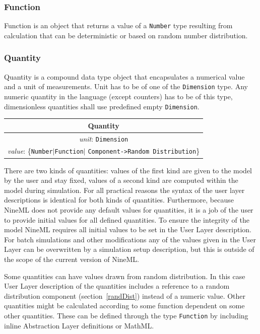 \documentclass{article}
\begin{document}
\subsubsection{Function}

Function is an object that returns a value of a {\tt Number} type resulting
from calculation that can be deterministic or based on random number
distribution.

\subsubsection{Quantity}

Quantity is a compound data type object that encapsulates a numerical value
and a unit of measurements. Unit has to be of one of the {\tt Dimension} type.
Any numeric quantity in the language (except counters) has to be of this type,
dimensionless quantities shall use predefined empty {\tt Dimension}.

\begin{table}[htb]
\center
\begin{tabular}{|c|}
\hline
\hline
Quantity \\
\hline
\hline
{\em unit}: {\tt Dimension} \\
\hline
{\em value}: \{{\tt Number}$|${\tt Function}$|$%
{\tt Component->Random Distribution}\} \\
\hline
\end{tabular}
\end{table}

There are two kinds of quantities: values of the first kind are given to the
model by the user and stay fixed, values of a second kind are computed within
the model during simulation. For all practical reasons the syntax of the user
layer descriptions is identical for both kinds of quantities. Furthermore,
because NineML does not provide any default values for quantities, it is a
job of the user to provide initial values for all defined quantities. To
ensure the integrity of the model NineML requires all initial values to be
set in the User Layer description. For batch simulations and other
modifications any of the values given in the User Layer can be overwritten
by a simulation setup description, but this is outside of the scope of the
current version of NineML.

Some quantities can have values drawn from random distribution. In this case
User Layer description of the quantities includes a reference to a random
distribution component (section~\ref{randDist}) instead of a numeric value.
Other quantities might be calculated according to some function dependent on
some other quantities. These can be defined through the type {\tt Function} by
including inline Abstraction Layer definitions or MathML.
\end{document}

